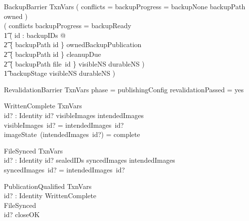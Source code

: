 \documentclass{article}
\begin{document}
\begin{schema}{BackupBarrier}
	TxnVars
	\where
	( conflicts = \emptyset \land backupProgress = backupNone \land
	backupPath \notin \dom owned ) \lor \\
	( conflicts \neq \emptyset \land backupProgress = backupReady \land \\
	\t1 ( \exists id : backupIDs @ \\
	\t2 \{ backupPath \mapsto id \} \subseteq ownedBackupPublication \land \\
	\t2 \{ backupPath \mapsto id \} \subseteq cleanupDue \land \\
	\t2 \{ backupPath \mapsto file~id \} \subseteq visibleNS \cap durableNS ) \land \\
	\t1 backupStage \notin \dom visibleNS \cup \dom durableNS )
\end{schema}

\begin{schema}{RevalidationBarrier}
	TxnVars
	\where
	phase = publishingConfig \land revalidationPassed = yes
\end{schema}

\begin{schema}{WrittenComplete}
	TxnVars \\
	id? : Identity
	\where
	id? \in \dom visibleImages \cap \dom intendedImages \\
	visibleImages~id? = intendedImages~id? \\
	imageState~(intendedImages~id?) = complete
\end{schema}

\begin{schema}{FileSynced}
	TxnVars \\
	id? : Identity
	\where
	id? \in sealedIDs \cap \dom syncedImages \cap \dom intendedImages \\
	syncedImages~id? = intendedImages~id?
\end{schema}

\begin{schema}{PublicationQualified}
	TxnVars \\
	id? : Identity
	\where
	WrittenComplete \\
	FileSynced \\
	id? \in closeOK
\end{schema}
\end{document}
